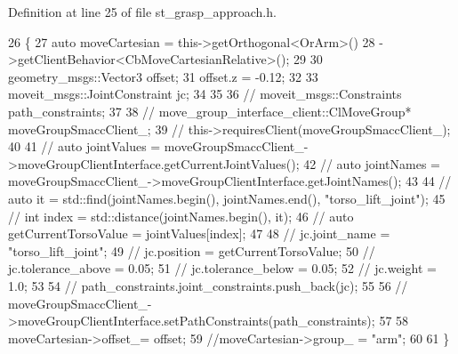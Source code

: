 Definition at line 25 of file st\+\_\+grasp\+\_\+approach.\+h.


\begin{DoxyCode}
26     \{
27         \textcolor{keyword}{auto} moveCartesian = this->getOrthogonal<OrArm>()
28                                 ->getClientBehavior<CbMoveCartesianRelative>();
29 
30         geometry\_msgs::Vector3 offset;
31         offset.z = -0.12;
32 
33         moveit\_msgs::JointConstraint jc;
34         
35 
36         \textcolor{comment}{// moveit\_msgs::Constraints path\_constraints;}
37 
38         \textcolor{comment}{// move\_group\_interface\_client::ClMoveGroup* moveGroupSmaccClient\_;}
39         \textcolor{comment}{// this->requiresClient(moveGroupSmaccClient\_);}
40 
41         \textcolor{comment}{// auto jointValues = moveGroupSmaccClient\_->moveGroupClientInterface.getCurrentJointValues();}
42         \textcolor{comment}{// auto jointNames = moveGroupSmaccClient\_->moveGroupClientInterface.getJointNames();}
43         
44         \textcolor{comment}{// auto it = std::find(jointNames.begin(), jointNames.end(), "torso\_lift\_joint");}
45         \textcolor{comment}{// int index = std::distance(jointNames.begin(), it);}
46         \textcolor{comment}{// auto getCurrentTorsoValue = jointValues[index];}
47 
48         \textcolor{comment}{// jc.joint\_name = "torso\_lift\_joint";  }
49         \textcolor{comment}{// jc.position = getCurrentTorsoValue;}
50         \textcolor{comment}{// jc.tolerance\_above = 0.05;}
51         \textcolor{comment}{// jc.tolerance\_below = 0.05;}
52         \textcolor{comment}{// jc.weight = 1.0; }
53         
54         \textcolor{comment}{// path\_constraints.joint\_constraints.push\_back(jc);}
55 
56         \textcolor{comment}{// moveGroupSmaccClient\_->moveGroupClientInterface.setPathConstraints(path\_constraints);}
57 
58         moveCartesian->offset\_= offset;
59         \textcolor{comment}{//moveCartesian->group\_ = "arm";}
60 
61     \}
\end{DoxyCode}
\mbox{\label{structsm__moveit__3_1_1pick__states_1_1StGraspApproach_ae692df25d8b4e0d175ba09399e680a4a}} 

